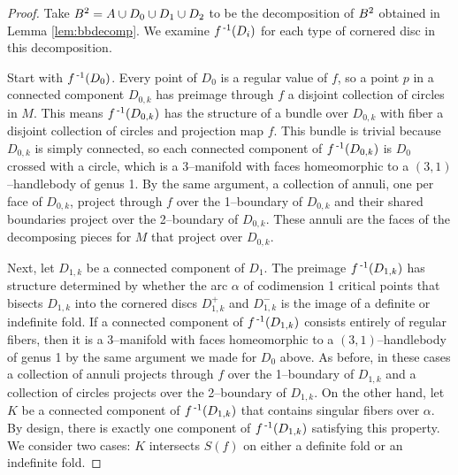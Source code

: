 \begin{proof}
	Take $B^2=A\cup D_0\cup D_1\cup D_2$ to be the decomposition of $B^2$ obtained in Lemma \ref{lem:bbdecomp}.
	We examine $f^{\,\text{-}1}(D_i)$ for each type of cornered disc in this decomposition.
	
	Start with $f^{\,\text{-}1}(D_0)$.
	Every point of $D_0$ is a regular value of $f$, so a point $p$ in a connected component $D_{0,k}$ has preimage through $f$ a disjoint collection of circles in $M$.
	This means $f^{\,\text{-}1}(D_{0,k})$ has the structure of a bundle over $D_{0,k}$ with fiber a disjoint collection of circles and projection map $f$.
	This bundle is trivial because $D_{0,k}$ is simply connected, so each connected component of $f^{\,\text{-}1}(D_{0,k})$ is $D_0$ crossed with a circle, which is a 3--manifold with faces homeomorphic to a $(3,1)$--handlebody of genus 1.
	By the same argument, a collection of annuli, one per face of $D_{0,k}$, project through $f$ over the 1--boundary of $D_{0,k}$ and their shared boundaries project over the 2--boundary of $D_{0,k}$.
	These annuli are the faces of the decomposing pieces for $M$ that project over $D_{0,k}$.
	
	Next, let $D_{1,k}$ be a connected component of $D_1$.
	The preimage $f^{\,\text{-}1}(D_{1,k})$ has structure determined by whether the arc $\alpha$ of codimension 1 critical points that bisects $D_{1,k}$ into the cornered discs $D_{1,k}^+$ and $D_{1,k}^-$ is the image of a definite or indefinite fold.
	If a connected component of $f^{\,\text{-}1}(D_{1,k})$ consists entirely of regular fibers, then it is a 3--manifold with faces homeomorphic to a $(3,1)$--handlebody of genus 1 by the same argument we made for $D_0$ above.
	As before, in these cases a collection of annuli projects through $f$ over the 1--boundary of $D_{1,k}$ and a collection of circles projects over the 2--boundary of $D_{1,k}$.
	On the other hand, let $K$ be a connected component of $f^{\,\text{-}1}(D_{1,k})$ that contains singular fibers over $\alpha$.
	By design, there is exactly one component of $f^{\,\text{-}1}(D_{1,k})$ satisfying this property.
	We consider two cases: $K$ intersects $S(f)$ on either a definite fold or an indefinite fold.
	

\end{proof}
